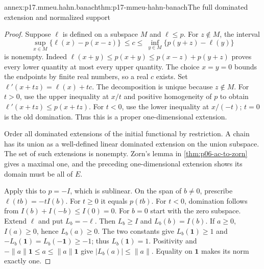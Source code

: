 \begin{annexitem}{annex:p17.mmeu.hahn.banach}{thm:p17-mmeu-hahn-banach}{The full dominated extension and normalized support}
\begin{proof}
Suppose \(\ell\) is defined on a subspace \(M\)
and \(\ell\leq p\). For \(z\notin M\), the
interval
\[
 \sup_{x\in M}\{\ell(x)-p(x-z)\}
        \ \leq c\leq\
 \inf_{y\in M}\{p(y+z)-\ell(y)\}
\]
is nonempty. Indeed
\(\ell(x+y)\leq p(x+y)\leq p(x-z)+p(y+z)\)
proves every lower quantity at most every
upper quantity. The choice \(x=y=0\)
bounds the endpoints by finite real numbers,
so a real \(c\) exists.
Set \(\ell'(x+tz)=\ell(x)+tc\).
The decomposition is unique because \(z\notin M\).
For \(t>0\), use the upper inequality at
\(x/t\) and positive homogeneity of \(p\)
to obtain \(\ell'(x+tz)\leq p(x+tz)\).
For \(t<0\), use the lower inequality at
\(x/(-t)\); \(t=0\) is the old domination.
Thus this is a proper one-dimensional extension.

Order all dominated extensions of the initial
functional by restriction. A chain has its
union as a well-defined linear dominated
extension on the union subspace.
The set of such extensions is nonempty.
Zorn's lemma in \cref{thm:p06-ac-to-zorn}
gives a maximal one, and the preceding
one-dimensional extension shows its domain
must be all of \(E\).

Apply this to \(p=-I\), which is sublinear.
On the span of \(b\ne0\), prescribe
\(\ell(tb)=-tI(b)\).
For \(t\geq0\) it equals \(p(tb)\).
For \(t<0\), domination follows from
\(I(b)+I(-b)\leq I(0)=0\).
For \(b=0\) start with the zero subspace.
Extend \(\ell\) and put \(L_b=-\ell\).
Then \(L_b\geq I\) and \(L_b(b)=I(b)\).
If \(a\geq0\), \(I(a)\geq0\), hence \(L_b(a)\geq0\).
The two constants give
\(L_b(\mathbf1)\geq1\) and
\(-L_b(\mathbf1)=L_b(-\mathbf1)\geq-1\);
thus \(L_b(\mathbf1)=1\).
Positivity and
\(-\|a\|\mathbf1\leq a\leq\|a\|\mathbf1\)
give \(|L_b(a)|\leq\|a\|\).
Equality on \(\mathbf1\) makes its norm exactly one.
\end{proof}
\end{annexitem}

